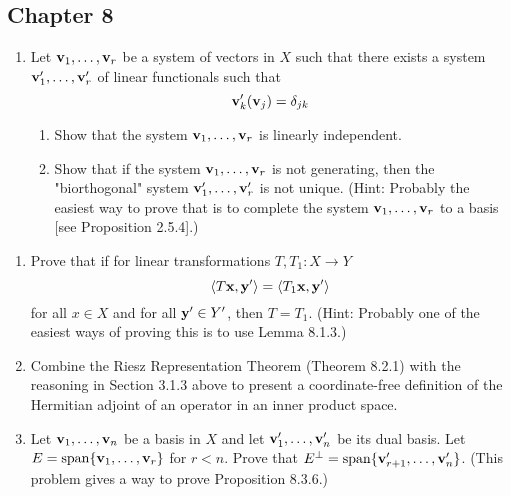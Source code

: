 \documentclass[../psets.tex]{subfiles}
\begin{document}
\subsection*{Chapter 8}
\begin{enumerate}[label={\textbf{1.\arabic*.}}]
    \item Let $\mathbf{v}_1,\dots,\mathbf{v}_r$ be a system of vectors in $X$ such that there exists a system $\mathbf{v}_1',\dots,\mathbf{v}_r'$ of linear functionals such that
    \begin{equation*}
        \mathbf{v}_k'(\mathbf{v}_j) = \delta_{jk}
    \end{equation*}
    \begin{enumerate}
        \item Show that the system $\mathbf{v}_1,\dots,\mathbf{v}_r$ is linearly independent.
        \item Show that if the system $\mathbf{v}_1,\dots,\mathbf{v}_r$ is not generating, then the "biorthogonal" system $\mathbf{v}_1',\dots,\mathbf{v}_r'$ is not unique. (Hint: Probably the easiest way to prove that is to complete the system $\mathbf{v}_1,\dots,\mathbf{v}_r$ to a basis [see Proposition 2.5.4].)
    \end{enumerate}
\end{enumerate}

\begin{enumerate}[label={\textbf{3.\arabic*.}}]
    \item Prove that if for linear transformations $T,T_1:X\to Y$
    \begin{equation*}
        \langle T\mathbf{x},\mathbf{y}'\rangle = \langle T_1\mathbf{x},\mathbf{y}'\rangle
    \end{equation*}
    for all $x\in X$ and for all $\mathbf{y}'\in Y'$, then $T=T_1$. (Hint: Probably one of the easiest ways of proving this is to use Lemma 8.1.3.)
    \item Combine the Riesz Representation Theorem (Theorem 8.2.1) with the reasoning in Section 3.1.3 above to present a coordinate-free definition of the Hermitian adjoint of an operator in an inner product space.
    \item Let $\mathbf{v}_1,\dots,\mathbf{v}_n$ be a basis in $X$ and let $\mathbf{v}_1',\dots,\mathbf{v}_n'$ be its dual basis. Let $E=\operatorname{span}\{\mathbf{v}_1,\dots,\mathbf{v}_r\}$ for $r<n$. Prove that $E^\perp=\operatorname{span}\{\mathbf{v}_{r+1}',\dots,\mathbf{v}_n'\}$. (This problem gives a way to prove Proposition 8.3.6.)
\end{enumerate}
\end{document}
